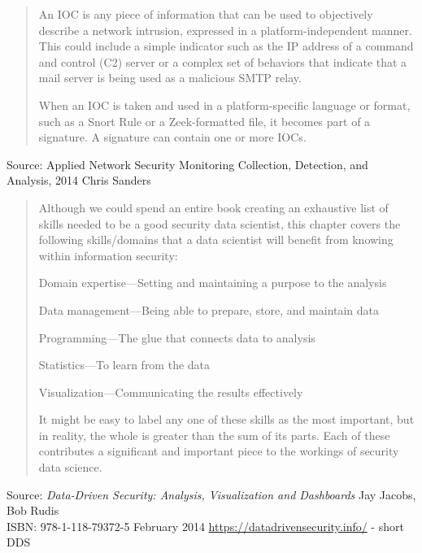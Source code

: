 \documentclass[Screen16to9,17pt]{foils}
\begin{document}

\begin{quote}
An IOC is any piece of information that can be used to objectively describe a network intrusion, expressed in a platform-independent manner. This could include a simple indicator such as the IP address of a command and control (C2) server or a complex set of behaviors that indicate that a mail server is being used as a malicious SMTP relay.

When an IOC is taken and used in a platform-specific language or format, such as a Snort Rule or a Zeek-formatted file, it becomes part of a signature. A signature can contain one or more IOCs.
\end{quote}

Source: Applied Network Security Monitoring Collection, Detection, and Analysis, 2014 Chris Sanders



\begin{quote}
Although we could spend an entire book creating an exhaustive list of skills needed to be a good security data scientist, this chapter covers the following skills/domains that a data scientist will benefit from
knowing within information security:
\begin{list2}
\item Domain expertise—Setting and maintaining a purpose to the analysis
\item Data management—Being able to prepare, store, and maintain data
\item Programming—The glue that connects data to analysis
\item Statistics—To learn from the data
\item Visualization—Communicating the results effectively
\end{list2}
It might be easy to label any one of these skills as the most important, but in reality, the whole is greater than the sum of its parts. Each of these contributes a significant and important piece to the workings of
security data science.
\end{quote}

Source: \emph{Data-Driven Security: Analysis, Visualization and Dashboards} Jay Jacobs, Bob Rudis\\
ISBN: 978-1-118-79372-5 February 2014 \url{https://datadrivensecurity.info/} - short DDS




\end{document}
